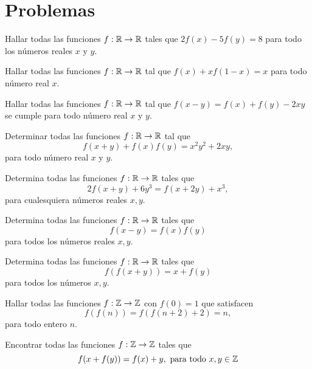 \section{Problemas}

\begin{exercise}
    Hallar todas las funciones $f : \mathbb{R} \to \mathbb{R}$ tales que $2f(x) - 5f(y) = 8$ para todo los números reales $x$ y $y$.
\end{exercise}

\begin{exercise}
    Hallar todas las funciones $f : \mathbb{R} \to \mathbb{R}$ tal que $f(x) + xf(1 - x) = x$ para todo número real $x$.
\end{exercise}

\begin{exercise}
    Hallar todas las funciones $f : \mathbb{R} \to \mathbb{R}$ tal que $f(x - y) = f(x) + f(y) - 2xy$ se cumple para todo número real $x$ y $y$.
\end{exercise}

\begin{exercise}
    Determinar todas las funciones $f : \mathbb{R} \to \mathbb{R}$ tal que
    \[
        f(x + y) + f(x)f(y) = x^2 y^2 + 2xy,
    \]
    para todo número real $x$ y $y$.
\end{exercise}

\begin{exercise}
    Determina todas las funciones $f : \mathbb{R} \to \mathbb{R}$ tales que
    \[
        2f(x + y) + 6y^3 = f(x + 2y) + x^3,
    \]
    para cualesquiera números reales $x,y$.
\end{exercise}

\begin{exercise}
    Determina todas las funciones $f : \mathbb{R} \to \mathbb{R}$ tales que
    \[
        f(x - y) = f(x)f(y)
    \]
    para todos los números reales $x,y$.
\end{exercise}

\begin{exercise}
    Determina todas las funciones $f : \mathbb{R} \to \mathbb{R}$ tales que
    \[
        f(f(x + y)) = x + f(y)
    \]
    para todos los números $x,y$.
\end{exercise}

\begin{exercise}
    Hallar todas las funciones $f : \mathbb{Z} \to \mathbb{Z}$ con $f(0) = 1$ que satisfacen
    \[
        f(f(n)) = f(f(n + 2) + 2) = n,
    \]
    para todo entero $n$.
\end{exercise}

\begin{exercise}
    Encontrar todas las funciones $f : \mathbb{Z} \to \mathbb{Z}$ tales que
    \[
        f(x + f(y)) = f(x) + y,\ \text{para todo}\ x,y \in \mathbb{Z}
    \]
\end{exercise}

